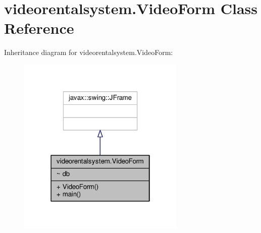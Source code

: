\hypertarget{classvideorentalsystem_1_1VideoForm}{\section{videorentalsystem.\-Video\-Form Class Reference}
\label{classvideorentalsystem_1_1VideoForm}
}


Inheritance diagram for videorentalsystem.\-Video\-Form\-:
\nopagebreak
\begin{figure}[H]
\begin{center}
\leavevmode
\includegraphics[width=226pt]{classvideorentalsystem_1_1VideoForm__inherit__graph}
\end{center}
\end{figure}


